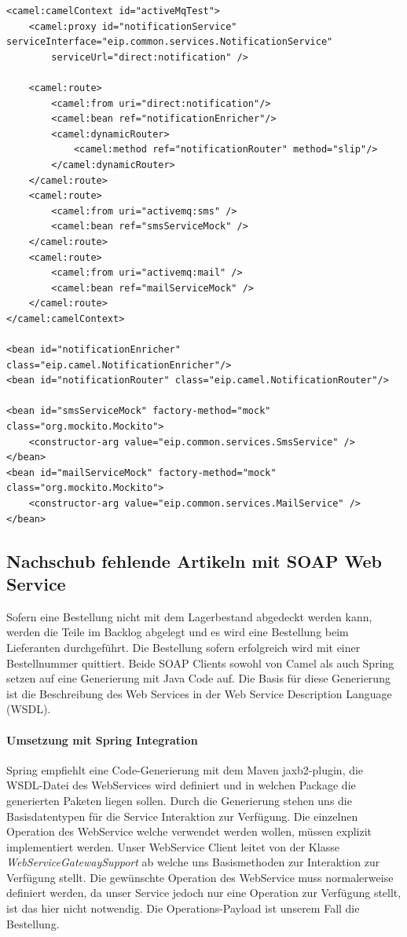 \documentclass[12pt,a4paper,ngerman]{article}
\begin{document}
\begin{lstlisting}
<camel:camelContext id="activeMqTest">
    <camel:proxy id="notificationService" serviceInterface="eip.common.services.NotificationService"
        serviceUrl="direct:notification" />

    <camel:route>
        <camel:from uri="direct:notification"/>
        <camel:bean ref="notificationEnricher"/>
        <camel:dynamicRouter>
            <camel:method ref="notificationRouter" method="slip"/>
        </camel:dynamicRouter>
    </camel:route>
    <camel:route>
        <camel:from uri="activemq:sms" />
        <camel:bean ref="smsServiceMock" />
    </camel:route>
    <camel:route>
        <camel:from uri="activemq:mail" />
        <camel:bean ref="mailServiceMock" />
    </camel:route>
</camel:camelContext>

<bean id="notificationEnricher" class="eip.camel.NotificationEnricher"/>
<bean id="notificationRouter" class="eip.camel.NotificationRouter"/>

<bean id="smsServiceMock" factory-method="mock" class="org.mockito.Mockito">
    <constructor-arg value="eip.common.services.SmsService" />
</bean>
<bean id="mailServiceMock" factory-method="mock" class="org.mockito.Mockito">
    <constructor-arg value="eip.common.services.MailService" />
</bean>
\end{lstlisting}

\subsection{Nachschub fehlende Artikeln mit SOAP Web Service}

Sofern eine Bestellung nicht mit dem Lagerbestand abgedeckt werden kann,
werden die Teile im Backlog abgelegt und es wird eine Bestellung beim
Lieferanten durchgeführt. Die Bestellung sofern erfolgreich wird mit
einer Bestellnummer quittiert. Beide SOAP Clients sowohl von Camel als
auch Spring setzen auf eine Generierung mit Java Code auf. Die Basis für
diese Generierung ist die Beschreibung des Web Services in der Web
Service Description Language (WSDL).

\paragraph{Umsetzung mit Spring Integration}

Spring empfiehlt eine Code-Generierung mit dem Maven jaxb2-plugin, die
WSDL-Datei des WebServices wird definiert und in welchen Package die
generierten Paketen liegen sollen. Durch die Generierung stehen uns die
Basisdatentypen für die Service Interaktion zur Verfügung. Die einzelnen
Operation des WebService welche verwendet werden wollen, müssen explizit
implementiert werden. Unser WebService Client leitet von der Klasse
\emph{WebServiceGatewaySupport} ab welche uns Basismethoden zur
Interaktion zur Verfügung stellt. Die gewünschte Operation des
WebService muss normalerweise definiert werden, da unser Service jedoch
nur eine Operation zur Verfügung stellt, ist das hier nicht notwendig.
Die Operations-Payload ist unserem Fall die Bestellung.
\end{document}

